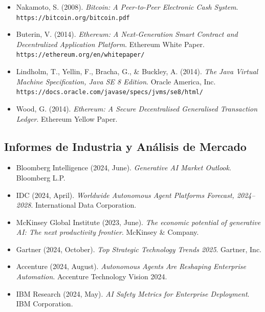 \documentclass[11pt]{article}
\begin{document}
\begin{itemize}[leftmargin=*, label={}]
  \item Nakamoto, S. (2008). \textit{Bitcoin: A Peer-to-Peer Electronic Cash System}. \texttt{https://bitcoin.org/bitcoin.pdf}

  \item Buterin, V. (2014). \textit{Ethereum: A Next-Generation Smart Contract and Decentralized Application Platform}. Ethereum White Paper. \texttt{https://ethereum.org/en/whitepaper/}

  \item Lindholm, T., Yellin, F., Bracha, G., \& Buckley, A. (2014). \textit{The Java Virtual Machine Specification, Java SE 8 Edition}. Oracle America, Inc. \texttt{https://docs.oracle.com/javase/specs/jvms/se8/html/}

  \item Wood, G. (2014). \textit{Ethereum: A Secure Decentralised Generalised Transaction Ledger}. Ethereum Yellow Paper.
\end{itemize}

\subsection*{Informes de Industria y Análisis de Mercado}

\begin{itemize}[leftmargin=*, label={}]
  \item Bloomberg Intelligence (2024, June). \textit{Generative AI Market Outlook}. Bloomberg L.P.

  \item IDC (2024, April). \textit{Worldwide Autonomous Agent Platforms Forecast, 2024--2028}. International Data Corporation.

  \item McKinsey Global Institute (2023, June). \textit{The economic potential of generative AI: The next productivity frontier}. McKinsey \& Company.

  \item Gartner (2024, October). \textit{Top Strategic Technology Trends 2025}. Gartner, Inc.

  \item Accenture (2024, August). \textit{Autonomous Agents Are Reshaping Enterprise Automation}. Accenture Technology Vision 2024.

  \item IBM Research (2024, May). \textit{AI Safety Metrics for Enterprise Deployment}. IBM Corporation.
\end{itemize}
\end{document}
